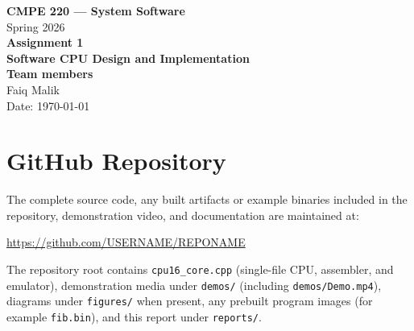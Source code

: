 \documentclass[12pt]{article}
\newcommand{\githuburl}{https://github.com/USERNAME/REPONAME}
\begin{document}
\begin{titlepage}
    \thispagestyle{empty}
    \centering
    \vspace*{1.5in}

    {\LARGE\bfseries CMPE 220 --- System Software}\\[0.35in]
    {\Large Spring 2026}\\[0.75in]

    {\LARGE\bfseries Assignment 1}\\[0.2in]
    {\LARGE\bfseries Software CPU Design and Implementation}\\[1.25in]

    {\large\bfseries Team members}\\[0.2in]
    {\large Faiq Malik}\\[1.5in]

    {\large Date: \today}
\end{titlepage}

\clearpage
\setcounter{page}{1}

\section*{GitHub Repository}

\noindent
The complete source code, any built artifacts or example binaries included in the repository, demonstration video, and documentation are maintained at:

\vspace{0.5in}
\begin{center}
\large\url{\githuburl}
\end{center}

\vspace{0.35in}
\noindent
The repository root contains \texttt{cpu16\_core.cpp} (single-file CPU, assembler, and emulator), demonstration media under \texttt{demos/} (including \texttt{demos/Demo.mp4}), diagrams under \texttt{figures/} when present, any prebuilt program images (for example \texttt{fib.bin}), and this report under \texttt{reports/}.

\clearpage

\end{document}
